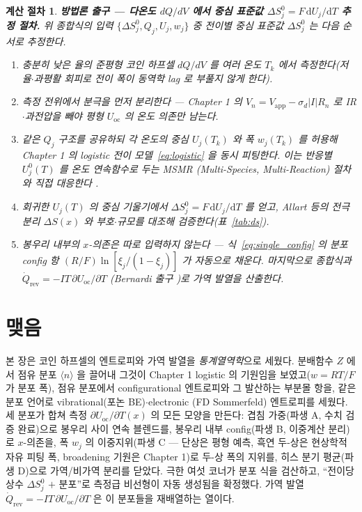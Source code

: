 \documentclass[11pt,a4paper]{article}
\newtheorem*{procedurebox}{계산 절차}
\newcommand{\dd}{\mathrm{d}}
\newcommand{\rev}{\mathrm{rev}}
\newcommand{\oc}{\mathrm{oc}}
\newcommand{\avg}[1]{\langle #1\rangle}
\begin{document}
\begin{procedurebox}
\textbf{방법론 출구 — 다온도 $dQ/dV$ 에서 중심 표준값 $\Delta S^0_j=F\,\dd U_j/\dd T$ 추정 절차.} 위 종합식의 입력
$\{\Delta S^0_j,Q_j,U_j,w_j\}$ 중 전이별 중심 표준값 $\Delta S^0_j$ 는 다음 순서로 추정한다.
\begin{enumerate}[leftmargin=1.8em,itemsep=2pt,topsep=2pt]
\item 충분히 낮은 율의 준평형 코인 하프셀 $dQ/dV$ 를 여러 온도 $T_k$ 에서 측정한다(저율$\cdot$과평활 회피로
전이 폭이 동역학 lag 로 부풀지 않게 한다).
\item 측정 전위에서 분극을 먼저 분리한다 — Chapter 1 의 $V_n=V_\mathrm{app}-\sigma_d|I|R_n$ 로 IR$\cdot$과전압을
빼야 \emph{평형} $U_\oc$ 의 온도 의존만 남는다.
\item 같은 $Q_j$ 구조를 공유하되 각 온도의 중심 $U_j(T_k)$ 와 폭 $w_j(T_k)$ 를 허용해 Chapter 1 의 logistic
전이 모델~\eqref{eq:logistic} 을 \emph{동시} 피팅한다. 이는 반응별 $U_j^0(T)$ 를 온도 연속함수로 두는 MSMR
(Multi-Species, Multi-Reaction) 절차와 직접 대응한다 \cite{msmr_partI,msmr_partII}.
\item 회귀한 $U_j(T)$ 의 중심 기울기에서 $\Delta S^0_j=F\,\dd U_j/\dd T$ 를 얻고, Allart 등의 전극 분리
$\Delta S(x)$ \cite{allart2018} 와 부호$\cdot$규모를 대조해 검증한다(표~\ref{tab:ds}).
\item 봉우리 \emph{내부}의 $x$-의존은 따로 입력하지 않는다 — 식~\eqref{eq:single_config} 의 분포 config 항
$(R/F)\ln[\xi_j/(1-\xi_j)]$ 가 자동으로 채운다. 마지막으로 종합식과 $\dot Q_\rev=-IT\,\partial U_\oc/\partial T$
(Bernardi 출구 \cite{bernardi1985})로 가역 발열을 산출한다.
\end{enumerate}
\end{procedurebox}

\section*{맺음}
본 장은 코인 하프셀의 엔트로피와 가역 발열을 \emph{통계열역학}으로 세웠다. 분배함수 $Z$ 에서 점유 분포
$\avg{n}$ 을 끌어내 그것이 Chapter 1 logistic 의 기원임을 보였고($w=RT/F$ 가 분포 폭), 점유 분포에서
configurational 엔트로피와 그 발산하는 부분몰 항을, 같은 분포 언어로 vibrational(포논 BE)$\cdot$electronic
(FD Sommerfeld) 엔트로피를 세웠다. 세 분포가 합쳐 측정 $\partial U_\oc/\partial T(x)$ 의 모든 모양을 만든다:
겹침 가중(파생 A, 수치 검증 완료)으로 봉우리 사이 연속 블렌드를, 봉우리 내부 config(파생 B, 이중계산 분리)로
$x$-의존을, 폭 $w_j$ 의 이중지위(파생 C — 단상은 평형 예측, 흑연 두-상은 현상학적 자유 피팅 폭, broadening
기원은 Chapter 1)로 두-상 폭의 지위를, 히스 분기 평균(파생 D)으로 가역/비가역
분리를 닫았다. 극한 여섯 코너가 분포 식을 검산하고, ``전이당 상수 $\Delta S^0_j$ $+$ 분포''로 측정급 비선형이
자동 생성됨을 확정했다. 가역 발열 $\dot Q_\rev=-IT\,\partial U_\oc/\partial T$ 은 이 분포들을 재배열하는 열이다.
\end{document}
